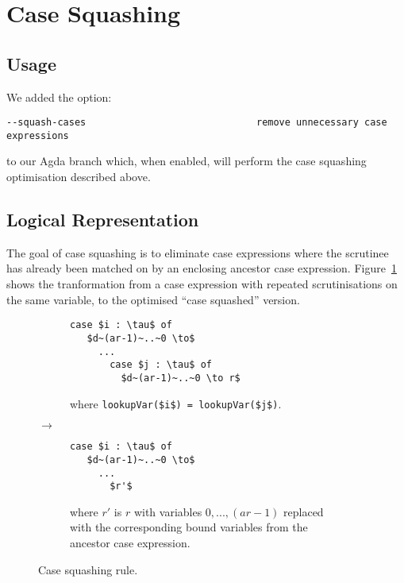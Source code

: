 \section{Case Squashing}

\subsection{Usage}

We added the option:

\begin{verbatim}
--squash-cases                              remove unnecessary case expressions
\end{verbatim}

to our Agda branch which, when enabled, will perform the case squashing optimisation described above.

\subsection{Logical Representation}

The goal of case squashing is to eliminate case expressions where the scrutinee has already been matched on by an enclosing ancestor case expression. Figure~\ref{fig:case_squash_rule} shows the tranformation from a case expression with repeated scrutinisations on the same variable, to the optimised ``case squashed'' version.

\begin{figure}[h]
\centering
\begin{subfigure}{.47\textwidth}
  \centering
  \begin{lstlisting}[style=math]
  case $i : \tau$ of
   $d~(ar-1)~..~0 \to$
     ...
       case $j : \tau$ of
         $d~(ar-1)~..~0 \to r$
  \end{lstlisting}
  where \lstinline[style=math]{lookupVar($i$) = lookupVar($j$)}.
\end{subfigure}
{\large$\to$}
\begin{subfigure}{.47\textwidth}
  \centering
  \begin{lstlisting}[style=math]
  case $i : \tau$ of
   $d~(ar-1)~..~0 \to$
     ...
       $r'$
  \end{lstlisting}
  where $r'$ is $r$ with variables $0, ..., (ar-1)$ replaced with the corresponding bound variables from the ancestor case expression.
\end{subfigure}
\caption{Case squashing rule.}
\label{fig:case_squash_rule}
\end{figure}


